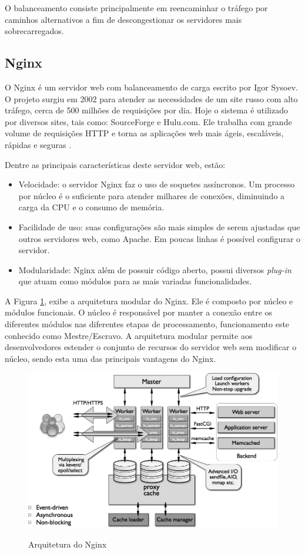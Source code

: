     O balanceamento consiste principalmente em reencaminhar o tráfego por caminhos alternativos a fim de descongestionar os servidores mais sobrecarregados.

\subsection{Nginx}

O Nginx é um servidor web com balanceamento de carga escrito por Igor Sysoev. O projeto surgiu em 2002 para atender as necessidades de um site russo com alto tráfego, cerca de 500 milhões de requisições por dia. Hoje o sistema é utilizado por diversos sites, tais como: SourceForge e Hulu.com. Ele trabalha com grande volume de requisições HTTP e torna as aplicações web mais ágeis, escaláveis, rápidas e seguras \cite{nginx}.

Dentre as principais características deste servidor web, estão:

\begin{itemize}
\item Velocidade: o servidor Nginx faz o uso de soquetes assíncronos. Um processo por núcleo é o suficiente para atender milhares de conexões, diminuindo a carga da CPU e o consumo de memória.
\item Facilidade de uso: suas configurações são mais simples de serem ajustadas que outros servidores web, como Apache. Em poucas linhas é possível configurar o servidor. 
\item Modularidade:  Nginx além de possuir código aberto, possui diversos \textit{plug-in} que atuam como módulos para as mais variadas funcionalidades.
\end{itemize}



A Figura \ref{fig:nginx}, exibe a arquitetura modular do Nginx. Ele é composto por núcleo e módulos funcionais. O núcleo é responsável por manter a conexão entre os diferentes módulos nas diferentes etapas de processamento, funcionamento este conhecido como Mestre/Escravo. A arquitetura modular permite aos desenvolvedores estender o conjunto de recursos do servidor web sem modificar o núcleo, sendo esta uma das principais vantagens do Nginx.

    \begin{figure}[htb]
    \centering
    \includegraphics[scale=0.40]{imagens/nginx.png}
    \caption{Arquitetura do Nginx} \cite{nginx}
    \label{fig:nginx}
    \end{figure} 


